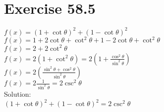 \documentclass[a4paper, 10pt]{scrartcl}
\begin{document}
\section{Exercise 58.5}

$f(x) = (1 + \cot{\theta})^{2} + (1 - \cot{\theta})^{2}$\\
$f(x) = 1 + 2\cot{\theta} + \cot^{2}{\theta} + 1 - 2\cot{\theta} + \cot^{2}{\theta}$\\
$f(x) = 2 + 2\cot^{2}{\theta}$\\
$f(x) = 2(1 + \cot^{2}{\theta}) = 2(1 + \frac{\cos^{2}{\theta}}{\sin^{2}{\theta}})$\\
$f(x) = 2(\frac{\sin^{2}{\theta} + \cos^{2}{\theta}}{\sin^{2}{\theta}})$\\
$f(x) = 2\frac{1}{\sin^{2}{\theta}} = 2\csc^{2}{\theta}$\\

Solution:\\
$(1 + \cot{\theta})^{2} + (1 - \cot{\theta})^{2} = 2\csc^{2}{\theta}$
\end{document}
